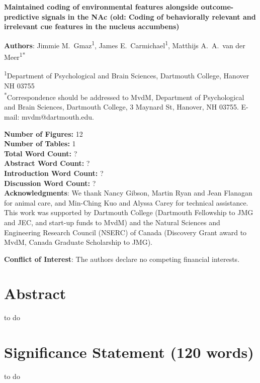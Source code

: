 \documentclass[11pt]{article}
\begin{document}
{\Large\bf Maintained coding of environmental features alongside outcome-predictive signals in the NAc (old: Coding of behaviorally relevant and irrelevant cue features in the nucleus accumbens)}

{\bf Authors}: Jimmie M.\ Gmaz\textsuperscript{1}, James
E.\ Carmichael\textsuperscript{1}, Matthijs A.\ A.\ van der
Meer\textsuperscript{1*}

\textsuperscript{1}Department of Psychological and Brain Sciences,
Dartmouth College, Hanover NH
03755\\ 

\textsuperscript{*}Correspondence should be addressed to MvdM,
Department of Psychological and Brain Sciences, Dartmouth College, 3
Maynard St, Hanover, NH 03755. E-mail: {\sffamily mvdm@dartmouth.edu}.

\textbf{Number of Figures:} 12\\
\textbf{Number of Tables:} 1\\
\textbf{Total Word Count:} ?\\
\textbf{Abstract Word Count:} ?\\
\textbf{Introduction Word Count:} ?\\
\textbf{Discussion Word Count:} ?\\

\textbf{Acknowledgments}: We thank Nancy Gibson, Martin Ryan and Jean
Flanagan for animal care, and Min-Ching Kuo and
Alyssa Carey for technical assistance. This work was supported by
Dartmouth College (Dartmouth Fellowship to JMG and JEC, and start-up funds to
MvdM) and the Natural Sciences and Engineering Research Council
(NSERC) of Canada (Discovery Grant award to MvdM, Canada Graduate
Scholarship to JMG).

\textbf{Conflict of Interest}: The authors declare no competing
financial interests.\\

\newpage
\linenumbers

\section*{Abstract}

to do

\section*{Significance Statement (120 words)}

to do

\newpage
\end{document}
